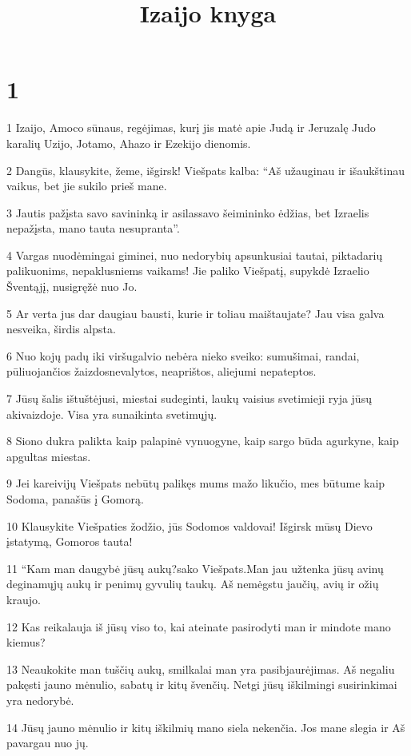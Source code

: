 

\title{Izaijo knyga}

\chapter{1}


\par 1 Izaijo, Amoco sūnaus, regėjimas, kurį jis matė apie Judą ir Jeruzalę Judo karalių Uzijo, Jotamo, Ahazo ir Ezekijo dienomis. 
\par 2 Dangūs, klausykite, žeme, išgirsk! Viešpats kalba: “Aš užauginau ir išaukštinau vaikus, bet jie sukilo prieš mane. 
\par 3 Jautis pažįsta savo savininką ir asilas­savo šeimininko ėdžias, bet Izraelis nepažįsta, mano tauta nesupranta”. 
\par 4 Vargas nuodėmingai giminei, nuo nedorybių apsunkusiai tautai, piktadarių palikuonims, nepaklusniems vaikams! Jie paliko Viešpatį, supykdė Izraelio Šventąjį, nusigręžė nuo Jo. 
\par 5 Ar verta jus dar daugiau bausti, kurie ir toliau maištaujate? Jau visa galva nesveika, širdis alpsta. 
\par 6 Nuo kojų padų iki viršugalvio nebėra nieko sveiko: sumušimai, randai, pūliuojančios žaizdos­nevalytos, neaprištos, aliejumi nepateptos. 
\par 7 Jūsų šalis ištuštėjusi, miestai sudeginti, laukų vaisius svetimieji ryja jūsų akivaizdoje. Visa yra sunaikinta svetimųjų. 
\par 8 Siono dukra palikta kaip palapinė vynuogyne, kaip sargo būda agurkyne, kaip apgultas miestas. 
\par 9 Jei kareivijų Viešpats nebūtų palikęs mums mažo likučio, mes būtume kaip Sodoma, panašūs į Gomorą. 
\par 10 Klausykite Viešpaties žodžio, jūs Sodomos valdovai! Išgirsk mūsų Dievo įstatymą, Gomoros tauta! 
\par 11 “Kam man daugybė jūsų aukų?­sako Viešpats.­Man jau užtenka jūsų avinų deginamųjų aukų ir penimų gyvulių taukų. Aš nemėgstu jaučių, avių ir ožių kraujo. 
\par 12 Kas reikalauja iš jūsų viso to, kai ateinate pasirodyti man ir mindote mano kiemus? 
\par 13 Neaukokite man tuščių aukų, smilkalai man yra pasibjaurėjimas. Aš negaliu pakęsti jauno mėnulio, sabatų ir kitų švenčių. Netgi jūsų iškilmingi susirinkimai yra nedorybė. 
\par 14 Jūsų jauno mėnulio ir kitų iškilmių mano siela nekenčia. Jos mane slegia ir Aš pavargau nuo jų. 
